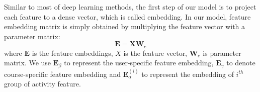 Similar to most of deep learning methods, the first step of our model is to project each feature to a dense vector, which is called embedding. In our model, feature embedding matrix is simply obtained by multiplying the feature vector with a parameter matrix: 
\begin{equation}
\mathbf{E} = \mathbf{X}\mathbf{W}_e
\end{equation}
where $\mathbf{E}$ is the feature embeddings, $X$ is the feature vector, $\mathbf{W}_e$ is parameter matrix. We use $\mathbf{E}_\beta$ to represent the user-specific feature embedding, $\mathbf{E}_\gamma$ to denote course-specific feature embedding and $\mathbf{E}_\alpha^{(i)}$ to represent the embedding of $i^{th}$ group of activity feature.
